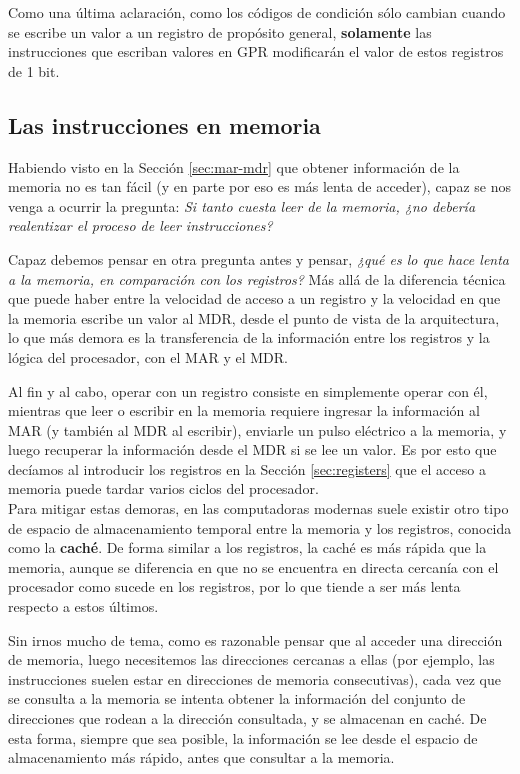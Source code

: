\documentclass[a4paper, titlepage]{report}
\begin{document}
	Como una última aclaración, como los códigos de condición sólo cambian cuando se escribe un valor a un registro de propósito general, \textbf{solamente} las instrucciones que escriban valores en GPR modificarán el valor de estos registros de 1 bit.
	
	\subsection{Las instrucciones en memoria}
	
	Habiendo visto en la Sección \ref{sec:mar-mdr} que obtener información de la memoria no es tan fácil (y en parte por eso es más lenta de acceder), capaz se nos venga a ocurrir la pregunta: \textit{Si tanto cuesta leer de la memoria, ¿no debería realentizar el proceso de leer instrucciones?}
	
	Capaz debemos pensar en otra pregunta antes y pensar, \textit{¿qué es lo que hace lenta a la memoria, en comparación con los registros?} Más allá de la diferencia técnica que puede haber entre la velocidad de acceso a un registro y la velocidad en que la memoria escribe un valor al MDR, desde el punto de vista de la arquitectura, lo que más demora es la transferencia de la información entre los registros y la lógica del procesador, con el MAR y el MDR.
	
	Al fin y al cabo, operar con un registro consiste en simplemente operar con él, mientras que leer o escribir en la memoria requiere ingresar la información al MAR (y también al MDR al escribir), enviarle un pulso eléctrico a la memoria, y luego recuperar la información desde el MDR si se lee un valor. Es por esto que decíamos al introducir los registros en la Sección \ref{sec:registers} que el acceso a memoria puede tardar varios ciclos del procesador.\\
	
	Para mitigar estas demoras, en las computadoras modernas suele existir otro tipo de espacio de almacenamiento temporal entre la memoria y los registros, conocida como la \textbf{caché}. De forma similar a los registros, la caché es más rápida que la memoria, aunque se diferencia en que no se encuentra en directa cercanía con el procesador como sucede en los registros, por lo que tiende a ser más lenta respecto a estos últimos.
	
	Sin irnos mucho de tema, como es razonable pensar que al acceder una dirección de memoria, luego necesitemos las direcciones cercanas a ellas (por ejemplo, las instrucciones suelen estar en direcciones de memoria consecutivas), cada vez que se consulta a la memoria se intenta obtener la información del conjunto de direcciones que rodean a la dirección consultada, y se almacenan en caché. De esta forma, siempre que sea posible, la información se lee desde el espacio de almacenamiento más rápido, antes que consultar a la memoria.
	
\end{document}
